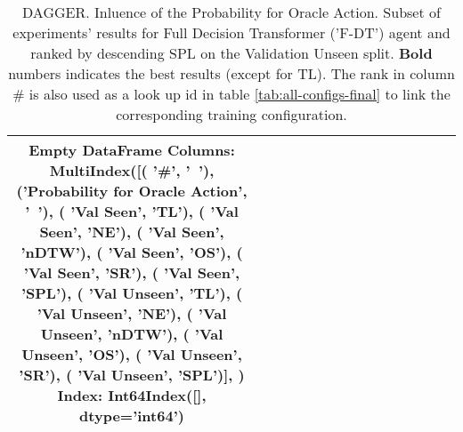 \begin{table}
\centering
\caption{\label{tab:f_dt_dagger_prob}DAGGER. Inluence of the Probability for Oracle Action. Subset of experiments' results for Full Decision Transformer ('F-DT') agent and ranked by descending SPL on the Validation Unseen split. \textbf{Bold} numbers indicates the best results (except for TL). The rank in column \# is also used as a look up id in table \ref{tab:all-configs-final} to link the corresponding training configuration.}
\begin{tabular}{@{\hskip3pt}c@{\hskip3pt}c@{\hskip3pt}c@{\hskip3pt}c@{\hskip3pt}c@{\hskip3pt}c@{\hskip3pt}c@{\hskip3pt}c@{\hskip3pt}c@{\hskip3pt}c@{\hskip3pt}c@{\hskip3pt}c@{\hskip3pt}c@{\hskip3pt}c@{\hskip3pt}c}
\toprule
Empty DataFrame
Columns: MultiIndex([(                           '\textbf{\#}',    '\textbf{~}'),
            ('\textbf{Probability for Oracle Action}',    '\textbf{~}'),
            (                     '\textbf{Val Seen}',   '\textbf{TL}'),
            (                     '\textbf{Val Seen}',   '\textbf{NE}'),
            (                     '\textbf{Val Seen}', '\textbf{nDTW}'),
            (                     '\textbf{Val Seen}',   '\textbf{OS}'),
            (                     '\textbf{Val Seen}',   '\textbf{SR}'),
            (                     '\textbf{Val Seen}',  '\textbf{SPL}'),
            (                   '\textbf{Val Unseen}',   '\textbf{TL}'),
            (                   '\textbf{Val Unseen}',   '\textbf{NE}'),
            (                   '\textbf{Val Unseen}', '\textbf{nDTW}'),
            (                   '\textbf{Val Unseen}',   '\textbf{OS}'),
            (                   '\textbf{Val Unseen}',   '\textbf{SR}'),
            (                   '\textbf{Val Unseen}',  '\textbf{SPL}')],
           )
Index: Int64Index([], dtype='int64') \\
\bottomrule
\end{tabular}
\end{table}
